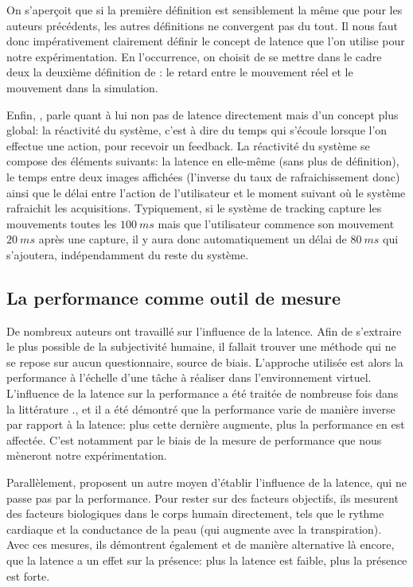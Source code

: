 	\par On s'aperçoit que si la première définition est sensiblement la même que pour les auteurs précédents, les autres définitions ne convergent pas du tout. Il nous faut donc impérativement clairement définir le concept de latence que l'on utilise pour notre expérimentation. En l'occurrence, on choisit de se mettre dans le cadre deux la deuxième définition de \citep{hale_handbook_2015}: le retard entre le mouvement réel et le mouvement dans la simulation.
	
	\par Enfin, \citep{watson_effects_1998}, parle quant à lui non pas de latence directement mais d'un concept plus global: la réactivité du système, c'est à dire du temps qui s'écoule lorsque l'on effectue une action, pour recevoir un feedback. La réactivité du système se compose des éléments suivants: la latence en elle-même (sans plus de définition), le temps entre deux images affichées (l'inverse du taux de rafraichissement donc) ainsi que le délai entre l'action de l'utilisateur et le moment suivant où le système rafraichit les acquisitions. Typiquement, si le système de tracking capture les mouvements toutes les $100~ms$ mais que l'utilisateur commence son mouvement $20~ms$ après une capture, il y aura donc automatiquement un délai de $80~ms$ qui s'ajoutera, indépendamment du reste du système.
	
	\subsection{La performance comme outil de mesure}
	\par De nombreux auteurs ont travaillé sur l'influence de la latence. Afin de s'extraire le plus possible de la subjectivité humaine, il fallait trouver une méthode qui ne se repose sur aucun questionnaire, source de biais. L'approche utilisée est alors la performance à l'échelle d'une tâche à réaliser dans l'environnement virtuel. L'influence de la latence sur la performance a été traitée de nombreuse fois dans la littérature \citep{ellis_sensor_1999,mania_perceptual_2004,watson_effects_1998,papadakis_system_2011,meehan_effect_2003}., et il a été démontré que la performance varie de manière inverse par rapport à la latence: plus cette dernière augmente, plus la performance en est affectée. C'est notamment par le biais de la mesure de performance que nous mèneront notre expérimentation.
	
	\par Parallèlement, \citep{meehan_effect_2003} proposent un autre moyen d'établir l'influence de la latence, qui ne passe pas par la performance. Pour rester sur des facteurs objectifs, ils mesurent des facteurs biologiques dans le corps humain directement, tels que le rythme cardiaque et la conductance de la peau (qui augmente avec la transpiration). Avec ces mesures, ils démontrent également et de manière alternative là encore, que la latence a un effet sur la présence: plus la latence est faible, plus la présence est forte.
	
